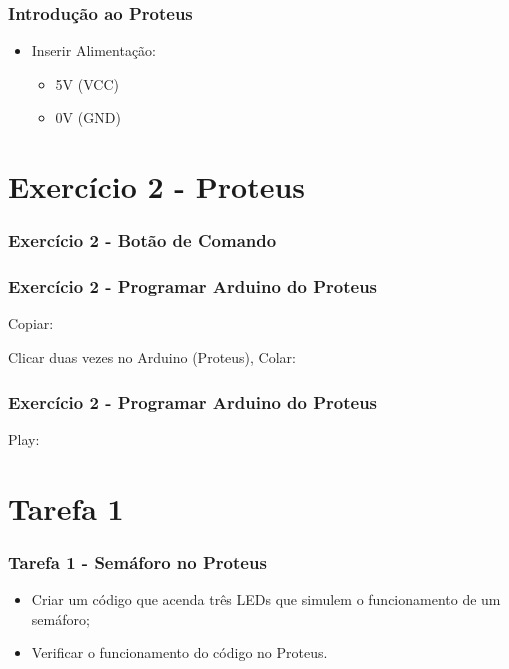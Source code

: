 \documentclass{beamer}
\begin{document}
\begin{frame}
	\frametitle{Introdução ao Proteus}
	\begin{itemize}
	\item Inserir Alimentação:
		\begin{itemize}
		\item 5V (VCC)
		\item 0V (GND)
		\end{itemize}
	\end{itemize}
\end{frame}

\section{Exercício 2 - Proteus}
\begin{frame}
	\frametitle{Exercício 2 - Botão de Comando}
	\begin{center}
	\end{center}
\end{frame}

\begin{frame}
	\frametitle{Exercício 2 - Programar Arduino do Proteus}
	Copiar:
	\begin{center}
	\end{center}
	Clicar duas vezes no Arduino (Proteus), Colar:
	\begin{center}
	\end{center}
\end{frame}

\begin{frame}
	\frametitle{Exercício 2 - Programar Arduino do Proteus}
	Play:
	\begin{center}
	\end{center}
\end{frame}

\section{Tarefa 1}
\begin{frame}[fragile]
	\frametitle{Tarefa 1 - Semáforo no Proteus}
	\begin{itemize}
	\item Criar um código que acenda três LEDs que simulem o funcionamento de um semáforo;
	\item Verificar o funcionamento do código no Proteus.
	\end{itemize}
\end{frame}
\end{document}
